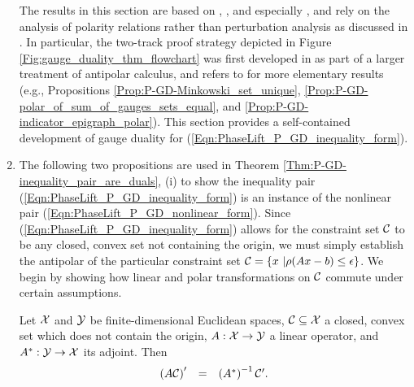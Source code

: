 \begin{enumerate}
The results in this section are based on \cite{rockafellar1970convex}, \cite{DBLP:journals/mp/Freund87}, and especially \cite{DBLP:journals/siamjo/FriedlanderMP14}, and rely on the analysis of polarity relations rather than perturbation analysis as discussed in \cite{aravkin2017foundations}.    In particular, the two-track proof strategy depicted in Figure \ref{Fig:gauge_duality_thm_flowchart} was first developed in \cite{DBLP:journals/siamjo/FriedlanderMP14} as part of a larger treatment of antipolar calculus, and refers to \cite{rockafellar1970convex} for more elementary results (e.g., Propositions \ref{Prop:P-GD-Minkowski_set_unique}, \ref{Prop:P-GD-polar_of_sum_of_gauges_sets_equal}, and \ref{Prop:P-GD-indicator_epigraph_polar}).  This section provides a self-contained development of gauge duality for (\ref{Eqn:PhaseLift_P_GD_inequality_form}).



\item

The following two propositions are used in Theorem \ref{Thm:P-GD-inequality_pair_are_duals}, (i) to show the inequality pair (\ref{Eqn:PhaseLift_P_GD_inequality_form}) is an instance of the nonlinear pair (\ref{Eqn:PhaseLift_P_GD_nonlinear_form}).  Since (\ref{Eqn:PhaseLift_P_GD_inequality_form}) allows for the constraint set ${\mathcal C}$ to be any closed, convex set not containing the origin, we must simply establish the antipolar of the particular constraint set ${\mathcal C} = \{ x \ | \rho(Ax-b) \leq \epsilon\}$.  We begin by showing how linear and polar transformations on ${\mathcal C}$ commute under certain assumptions.


\begin{prop}		\label{Prop:antipolar_set_equalities}
Let ${\mathcal X}$ and ${\mathcal Y}$ be finite-dimensional Euclidean spaces, ${\mathcal C} \subseteq {\mathcal X}$ a closed, convex set which does not contain the origin, $A : {\mathcal X} \rightarrow {\mathcal Y}$ a linear operator, and $A^* : {\mathcal Y} \rightarrow {\mathcal X}$ its adjoint.
Then
\begin{equation}		\label{Eqn:antipolar_set_equalities_1}
\begin{array}{rll}
\left( A {\mathcal C} \right)' & = & 	\left( A^* \right)^{-1} {\mathcal C}' .
\end{array}
\end{equation}


\end{prop}
\end{enumerate}
